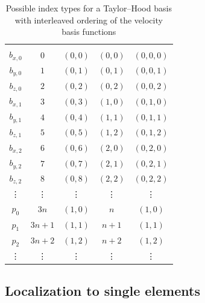 \documentclass[a4paper,10pt,headings=normal,bibliography=totoc]{scrartcl}
\begin{document}
\begin{table}
 \begin{center}
 \begin{tabular}{c|c|c|c|c}
 \hline \\
  $b_{x,0}$  & $0$    & $(0,0)$ & $(0,0)$ & $(0,0,0)$ \\
  $b_{y,0}$  & $1$    & $(0,1)$ & $(0,1)$ & $(0,0,1)$ \\
  $b_{z,0}$  & $2$    & $(0,2)$ & $(0,2)$ & $(0,0,2)$ \\
  $b_{x,1}$  & $3$    & $(0,3)$ & $(1,0)$ & $(0,1,0)$ \\
  $b_{y,1}$  & $4$    & $(0,4)$ & $(1,1)$ & $(0,1,1)$ \\
  $b_{z,1}$  & $5$    & $(0,5)$ & $(1,2)$ & $(0,1,2)$ \\
  $b_{x,2}$  & $6$    & $(0,6)$ & $(2,0)$ & $(0,2,0)$ \\
  $b_{y,2}$  & $7$    & $(0,7)$ & $(2,1)$ & $(0,2,1)$ \\
  $b_{z,2}$  & $8$    & $(0,8)$ & $(2,2)$ & $(0,2,2)$ \\
    \vdots   & \vdots & \vdots  & \vdots  & \vdots  \\
  $p_0$      & $3n$   & $(1,0)$ & $n$ & $(1,0)$ \\
  $p_1$      & $3n+1$ & $(1,1)$ & $n+1$ & $(1,1)$ \\
  $p_2$      & $3n+2$ & $(1,2)$ & $n+2$ & $(1,2)$ \\
    \vdots   & \vdots & \vdots  & \vdots  & \vdots
 \end{tabular}
 \end{center}
 \caption{Possible index types for a Taylor--Hood basis with interleaved ordering of the velocity basis functions
 \label{tbl:dune_functions:th_multiindices_interleaved}
 }
\end{table}

\subsection{Localization to single elements}
\end{document}
